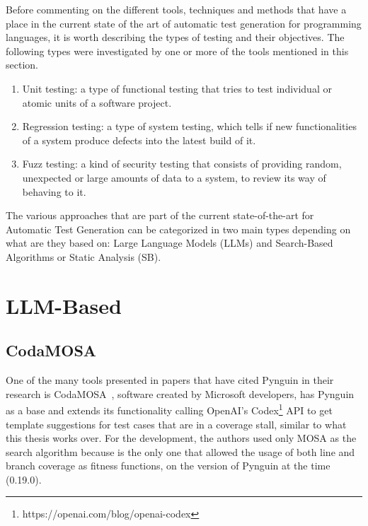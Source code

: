 \documentclass[%
  chapterprefix=false,%
  open=right,%
  twoside=true,%
  paper=a4,%
  logofile={Figures/logo.png},%
  thesistype=master,%
  UKenglish,%
]{se2thesis}
\begin{document}

Before commenting on the different tools, techniques and methods that have a place in the current state of the art of automatic test generation for programming languages, it is worth describing the types of testing and their objectives. The following types were investigated by one or more of the tools mentioned in this section. 

\begin{enumerate}
  \item Unit testing: a type of functional testing that tries to test individual or atomic units of a software project.
  \item Regression testing: a type of system testing, which tells if new functionalities of a system produce defects into the latest build of it.
  \item Fuzz testing: a kind of security testing that consists of providing random, unexpected or large amounts of data to a system, to review its way of behaving to it.
\end{enumerate}

The various approaches that are part of the current state-of-the-art for Automatic Test Generation can be categorized in two main types depending on what are they based on: Large Language Models (LLMs) and Search-Based Algorithms or Static Analysis (SB).

\section{LLM-Based}

\subsection{CodaMOSA}

One of the many tools presented in papers that have cited Pynguin in their research is CodaMOSA~\cite{DBLP:conf/icse/LemieuxILS23}, software created by Microsoft developers, has Pynguin as a base and extends its functionality calling OpenAI's Codex\footnote{https://openai.com/blog/openai-codex} API to get template suggestions for test cases that are in a coverage stall, similar to what this thesis works over.
For the development, the authors used only MOSA as the search algorithm because is the only one that allowed the usage of both line and branch coverage as fitness functions, on the version of Pynguin at the time (0.19.0).
\end{document}
